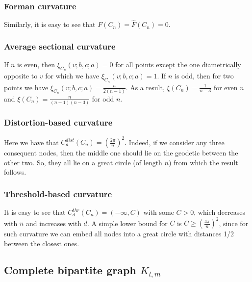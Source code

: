 \documentclass[runningheads]{llncs}
\begin{document}
\subsubsection{Forman curvature} 

Similarly, it is easy to see that $F(C_n) = \hat F(C_n) = 0$.

\subsubsection{Average sectional curvature} If $n$ is even, then $\xi_{C_n}(v;b,c;a) = 0$ for all points except the one diametrically opposite to $v$ for which we have $\xi_{C_n}(v;b,c;a) = 1$. If $n$ is odd, then for two points we have $\xi_{C_n}(v;b,c;a) = \frac{n}{2(n-1)}$. As a result, $\xi(C_n) = \frac{1}{n-3}$ for even $n$ and $\xi(C_n) = \frac{n}{(n-1)(n-3)}$ for odd $n$.

\subsubsection{Distortion-based curvature} 

Here we have that
$	C_d^{dist}(C_n) = \left(\frac{2\pi}{n}\right)^2.$
Indeed, if we consider any three consequent nodes, then the middle one should lie on the geodetic between the other two. So, they all lie on a great circle (of length $n$) from which the result follows.

\subsubsection{Threshold-based curvature} 
It is easy to see that $C_d^{thr}(C_n) = (-\infty, C)$ with some $C>0$, which decreases with $n$ and increases with $d$. 
A simple lower bound for $C$ is $C \ge \left(\frac{4\pi}{n}\right)^2$, since for such curvature we can embed all nodes into a great circle with distances 1/2 between the closest ones. 


\subsection{Complete bipartite graph $K_{l,m}$}
\end{document}
